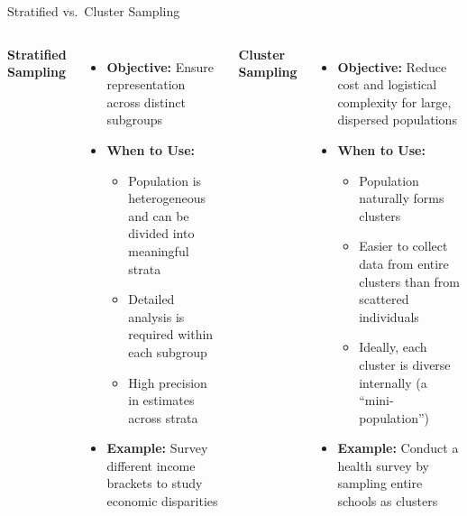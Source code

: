 \documentclass[handout]{beamer} %
\begin{document}
\begin{frame}{Stratified vs.\ Cluster Sampling}

{ \small
\begin{columns}[T]
    \textbf{Stratified Sampling}
    \begin{itemize}
        \item \textbf{Objective:} Ensure representation across distinct subgroups
        \item \textbf{When to Use:}
        \begin{itemize}
            \item Population is heterogeneous and can be divided into meaningful strata
            \item Detailed analysis is required within each subgroup
            \item High precision in estimates across strata
        \end{itemize} \pause %
        \item \textbf{Example:} Survey different income brackets to study economic disparities  \pause %
    \end{itemize}

    \textbf{Cluster Sampling}
    \begin{itemize}
        \item \textbf{Objective:} Reduce cost and logistical complexity for large, dispersed populations
        \item \textbf{When to Use:}
        \begin{itemize}
            \item Population naturally forms clusters
            \item Easier to collect data from entire clusters than from scattered individuals
            \item Ideally, each cluster is diverse internally (a “mini-population”)
        \end{itemize} \pause %
        \item \textbf{Example:} Conduct a health survey by sampling entire schools as clusters
    \end{itemize}
\end{columns}
}
\end{frame}
\end{document}
